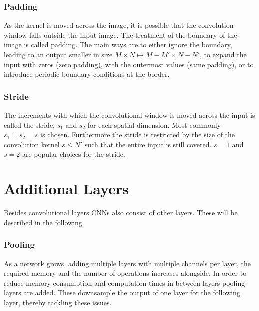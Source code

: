 %
%
%


\subsubsection{Padding}
As the kernel is moved across the image, it is possible that the convolution window falls outside the input image. The treatment of the boundary of the image is called padding. The main ways are to either ignore the boundary, leading to an output smaller in size $M\times N \mapsto M-M' \times N-N'$, to expand the input with zeros (zero padding), with the outermost values (same padding), or to introduce periodic boundary conditions at the border.

\subsubsection{Stride}
The increments with which the convolutional window is moved across the input is called the stride, $s_1$ and $s_2$ for each spatial dimension. Most commonly $s_1 = s_2 = s$ is chosen. Furthermore the stride is restricted by the size of the convolution kernel $s\leq N'$ such that the entire input is still covered. $s=1$ and $s=2$ are popular choices for the stride.

\section{Additional Layers}
Besides convolutional layers CNNs also consist of other layers. These will be described in the following.

\subsubsection{Pooling}
As a network grows, adding multiple layers with multiple channels per layer, the required memory and the number of operations increases alongside. In order to reduce memory consumption and computation times in between layers pooling layers are added. These downsample the output of one layer for the following layer, thereby tackling these issues.\\

